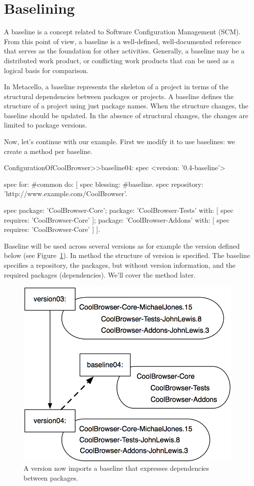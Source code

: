 \documentclass[a4paper,10pt,twoside]{book}
\begin{document}
\section{Baselining}
A baseline is a concept related to Software Configuration Management (SCM). From this point of view, a baseline is a well-defined, well-documented reference that serves as the foundation for other activities. Generally, a baseline may be a distributed work product, or conflicting work products that can be used as a logical basis for comparison. 

In Metacello, a baseline represents the skeleton of a project in terms of the structural dependencies between packages or projects. A baseline defines the structure of a project using just package names. When the structure changes, the baseline should be updated. In the absence of structural changes, the changes are limited to package versions.

Now, let's continue with our example. First we modify it to use baselines: we create a method per baseline. 

\begin{code}{}
ConfigurationOfCoolBrowser>>baseline04: spec 
	<version: '0.4-baseline'>
	
	spec for: #common do: [
		spec blessing: #baseline.
		spec repository: 'http://www.example.com/CoolBrowser'.
		
		spec 
			package: 'CoolBrowser-Core';
			package: 'CoolBrowser-Tests' with: [ spec requires: 'CoolBrowser-Core' ];
			package: 'CoolBrowser-Addons' with: [ spec requires: 'CoolBrowser-Core' ] ].

\end{code}

Baseline  will be used across several versions as for example the version  defined below (see Figure~\ref{fig:version04}). In method  the structure of version  is specified. The baseline specifies a repository, the packages, but without version information, and the required packages (dependencies). We'll cover the  method  later.

\begin{figure}
\begin{center}
\includegraphics[width=0.6\linewidth]{version04}
\caption{A version now imports a baseline that expresses dependencies between packages.\label{fig:version04}}
\end{center}
\end{figure} 
\end{document}
